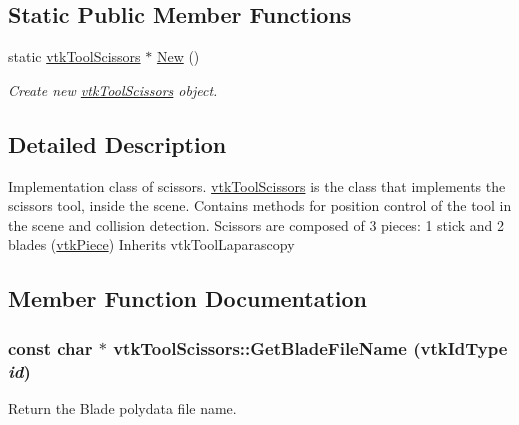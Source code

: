 \subsection*{Static Public Member Functions}
\begin{DoxyCompactItemize}
\item 
\hypertarget{classvtkToolScissors_a00c8e052acea8d41f78968667009eea0}{
static \hyperlink{classvtkToolScissors}{vtkToolScissors} $\ast$ \hyperlink{classvtkToolScissors_a00c8e052acea8d41f78968667009eea0}{New} ()}
\label{classvtkToolScissors_a00c8e052acea8d41f78968667009eea0}

\begin{DoxyCompactList}\small\item\em Create new \hyperlink{classvtkToolScissors}{vtkToolScissors} object. \item\end{DoxyCompactList}\end{DoxyCompactItemize}


\subsection{Detailed Description}
Implementation class of scissors. \hyperlink{classvtkToolScissors}{vtkToolScissors} is the class that implements the scissors tool, inside the scene. Contains methods for position control of the tool in the scene and collision detection. Scissors are composed of 3 pieces: 1 stick and 2 blades (\hyperlink{classvtkPiece}{vtkPiece}) Inherits vtkToolLaparascopy 

\subsection{Member Function Documentation}
\hypertarget{classvtkToolScissors_a822f326f7203d378c73ea61de8636b25}{
\subsubsection[{GetBladeFileName}]{\setlength{\rightskip}{0pt plus 5cm}const char $\ast$ vtkToolScissors::GetBladeFileName (vtkIdType {\em id})}}
\label{classvtkToolScissors_a822f326f7203d378c73ea61de8636b25}


Return the Blade polydata file name. 


